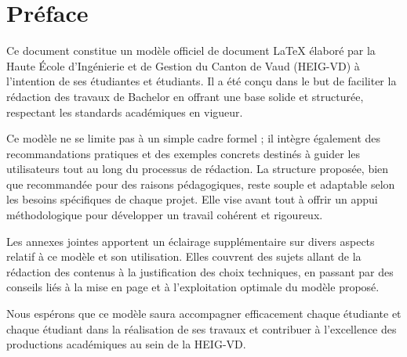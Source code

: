 \chapter*{Préface}

Ce document constitue un modèle officiel de document \LaTeX{} élaboré par la Haute École d'Ingénierie et de Gestion du Canton de Vaud (HEIG-VD) à l'intention de ses étudiantes et étudiants. Il a été conçu dans le but de faciliter la rédaction des travaux de Bachelor en offrant une base solide et structurée, respectant les standards académiques en vigueur.

Ce modèle ne se limite pas à un simple cadre formel ; il intègre également des recommandations pratiques et des exemples concrets destinés à guider les utilisateurs tout au long du processus de rédaction. La structure proposée, bien que recommandée pour des raisons pédagogiques, reste souple et adaptable selon les besoins spécifiques de chaque projet. Elle vise avant tout à offrir un appui méthodologique pour développer un travail cohérent et rigoureux.

Les annexes jointes apportent un éclairage supplémentaire sur divers aspects relatif à ce modèle et son utilisation. Elles couvrent des sujets allant de la rédaction des contenus à la justification des choix techniques, en passant par des conseils liés à la mise en page et à l'exploitation optimale du modèle proposé.

Nous espérons que ce modèle saura accompagner efficacement chaque étudiante et chaque étudiant dans la réalisation de ses travaux et contribuer à l'excellence des productions académiques au sein de la HEIG-VD.
